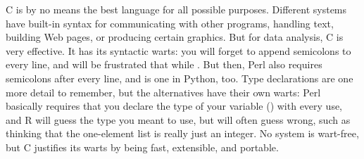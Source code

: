 C is by no means the best language for all possible purposes.
Different systems have built-in syntax for communicating with other programs, 
handling text, building Web pages, or producing certain graphics. But
for data analysis, C is very effective. It has its syntactic warts: you
will forget to append semicolons to every line, and will be frustrated
that  while . But then,
Perl also requires semicolons after every line, and  is one in
Python, too. Type declarations are one more detail to remember,
but the alternatives have their own warts: Perl basically requires that
you declare the type of your variable () with every use,
and R will guess the type you meant to use, but will often guess wrong,
such as thinking that the one-element list  is really just
an integer. No system is wart-free, but C justifies its warts by being fast,
extensible, and portable.




